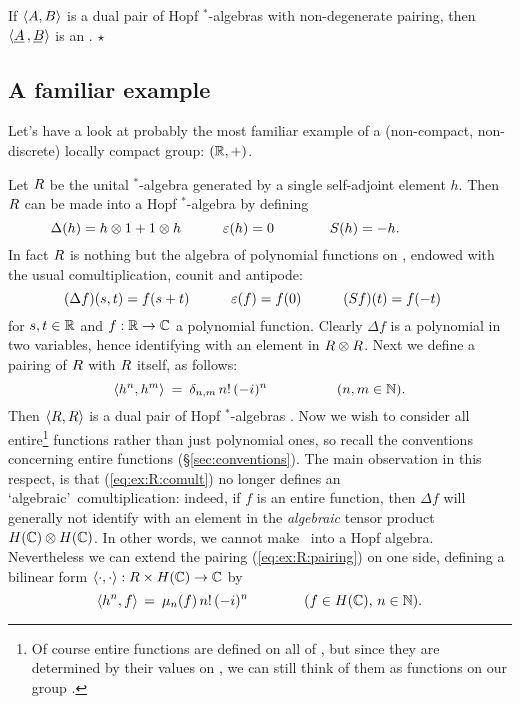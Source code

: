 \begin{ex} \label{ex:DPHA_is_Hopfstarsystem}
If\/ $\langle A,B \rangle$ is a dual pair of Hopf $^*$-algebras \cite{Fons:DPHA}
with non-degenerate pairing,
then $\langle \underline{A}\,,\underline{B\!}\, \rangle$ is an \ahss\@.
\hfill $\star$
\end{ex}



\subsection{A familiar example}

Let's have a look at probably the most familiar example of a (non-compact, non-discrete)
locally compact group: $(\mathbb{R},+)$.

Let $R$ be the unital $^*$-algebra generated by a single self-adjoint element $h$.
Then $R$ can be made into a Hopf $^*$-algebra by defining
$$ \Delta(h) = h \otimes 1 + 1 \otimes h \hspace{3em}
   \varepsilon(h) = 0  \hspace{4em}  S(h) = -h.  \hspace{5em} $$
In fact $R$ is nothing but the algebra of polynomial functions on \RR,
endowed with the usual comultiplication, counit and antipode:
\begin{equation}\label{eq:ex:R:comult}
 (\Delta f)(s,t) = f(s+t)  \hspace{3em} \varepsilon(f)=f(0)
     \hspace{3em} (Sf)(t) = f(-t) \hspace{1em}
\end{equation}
for $s,t \in \mathbb{R}$ and $f : \mathbb{R} \rightarrow \mathbb{C}$ a polynomial function.
Clearly $\Delta f$ is a polynomial in two variables, hence
identifying with an element in $R \otimes R$.
Next we define a pairing of $R$ with $R$ itself, as follows:
\begin{equation}\label{eq:ex:R:pairing}
  \langle h^n,h^m \rangle \:=\: \delta_{n,m}\, n!\,(-i)^n   \hspace{5em} (n,m \in\mathbb{N}).
\end{equation}
Then $\langle R,R \rangle$ is a dual pair of Hopf $^*$-algebras \cite{Fons:DPHA}\@.
Now we wish to consider all entire\footnote{
Of course entire functions are defined on all of \CC, but since
they are determined by their values on \RR, we can still think of them
as functions on our group \RR.}
functions rather than just polynomial ones, so recall the conventions concerning
entire functions (\S \ref{sec:conventions}).
The main observation in this respect, is that (\ref{eq:ex:R:comult}) no longer
defines an \lq algebraic\rq\ comultiplication:
indeed, if $f$ is an entire function, then $\Delta f$ will generally
not identify with an element in the {\em algebraic\/} tensor product $H(\mathbb{C}) \otimes H(\mathbb{C})$.
In other words, we cannot make \HC\ into a Hopf algebra.
Nevertheless we can extend the pairing (\ref{eq:ex:R:pairing}) on one side,
defining a bilinear form $\langle\cdot, \cdot\rangle :  R \times H(\mathbb{C})  \rightarrow \mathbb{C}$ by
\begin{equation}\label{eq:ex:PR:extendedpairing}
  \langle h^n,f \rangle \,=\: \mu_n(f)\, n!\, (-i)^n  \hspace{4em} (f\in H(\mathbb{C}),\, n \in \mathbb{N}).
\end{equation}


